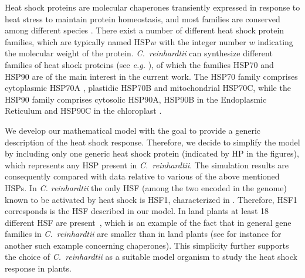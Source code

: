 \documentclass[oneside, 10pt, a4paper, twocolumn]{article}
\begin{document}
Heat shock proteins are molecular chaperones transiently expressed in
response to heat stress to maintain protein homeostasis, and most
families are conserved among different species \cite{Richter2010}.
There exist a number of different heat shock protein families, which are 
typically named HSP$w$ with the integer number $w$ indicating the molecular weight of the protein.
\emph{C.~reinhardtii} can synthesize different families of heat shock proteins (see {\it e.g.} \cite{Schroda2004}), 
of which the families HSP70 and HSP90 are of the main interest in the current work.
The HSP70 family 
comprises cytoplasmic HSP70A \cite{Muller1992}, plastidic HSP70B \cite{Drzymalla1996} 
and mitochondrial HSP70C, while the HSP90 family comprises cytosolic HSP90A, HSP90B in the Endoplasmic Reticulum 
and HSP90C in the chloroplast \cite{Wilmund2005}.  %

We develop our mathematical model with the goal to provide a generic description of the heat shock response.
Therefore, we decide to simplify the model by including only one generic heat shock protein (indicated by HP in the figures),
which represents any HSP present in \emph{C.~reinhardtii}. 
The simulation results are consequently compared with data relative to various of the above mentioned HSPs. 
In \emph{C. reinhardtii} the only HSF (among the two encoded in the genome) known to be activated 
by heat shock is HSF1, characterized in \cite{Schulz-Raffelt2007}. 
Therefore, HSF1 corresponds is the HSF described in our model. 
In land plants at least 18 different HSF are present~\cite{Scharf2012}, which is an example of the fact that in 
general gene families in \emph{C.~reinhardtii} are smaller than in land plants (see for instance \cite{Schroda2004} 
for another such example concerning chaperones). 
This simplicity further supports the choice of \textit{C.~reinhardtii} as a suitable model organism
to study the heat shock response in plants. 
\end{document}
